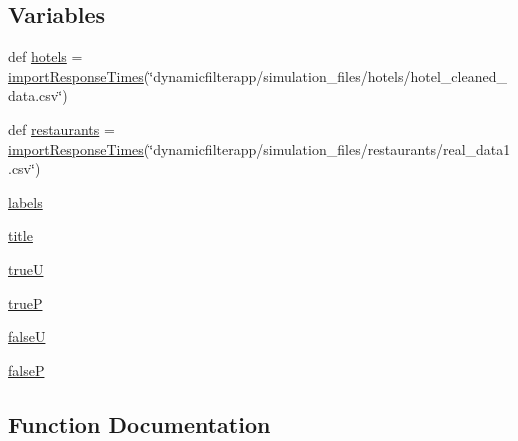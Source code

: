 \subsection*{Variables}
\begin{DoxyCompactItemize}
\item 
def \hyperlink{namespacedynamicfilterapp_1_1simulation__files_1_1response_time_distribution_a5dc6ecb2720239630808a8ab06ab1840}{hotels} = \hyperlink{namespacedynamicfilterapp_1_1simulation__files_1_1response_time_distribution_ae93872086b32d303395dd0b753af1775}{import\+Response\+Times}(\char`\"{}dynamicfilterapp/simulation\+\_\+files/hotels/hotel\+\_\+cleaned\+\_\+data.\+csv\char`\"{})
\item 
def \hyperlink{namespacedynamicfilterapp_1_1simulation__files_1_1response_time_distribution_a6caf9f682a37695b1f6baf64018c2994}{restaurants} = \hyperlink{namespacedynamicfilterapp_1_1simulation__files_1_1response_time_distribution_ae93872086b32d303395dd0b753af1775}{import\+Response\+Times}(\char`\"{}dynamicfilterapp/simulation\+\_\+files/restaurants/real\+\_\+data1.\+csv\char`\"{})
\item 
\hyperlink{namespacedynamicfilterapp_1_1simulation__files_1_1response_time_distribution_abc325fc13d4194905c1786e24ee447f0}{labels}
\item 
\hyperlink{namespacedynamicfilterapp_1_1simulation__files_1_1response_time_distribution_a051e403214cb6872ad3fe4e50302a6ee}{title}
\item 
\hyperlink{namespacedynamicfilterapp_1_1simulation__files_1_1response_time_distribution_afe318a0d18adb188fae94936f9b1d853}{trueU}
\item 
\hyperlink{namespacedynamicfilterapp_1_1simulation__files_1_1response_time_distribution_ae1891527aefb6a817d15668b0b1c0d6c}{trueP}
\item 
\hyperlink{namespacedynamicfilterapp_1_1simulation__files_1_1response_time_distribution_a0ab373b74e15cafdfd1ad2c58549a7c1}{falseU}
\item 
\hyperlink{namespacedynamicfilterapp_1_1simulation__files_1_1response_time_distribution_aa7f017430863ea8855038593e0853b30}{falseP}
\end{DoxyCompactItemize}


\subsection{Function Documentation}
\mbox{\label{namespacedynamicfilterapp_1_1simulation__files_1_1response_time_distribution_ae93872086b32d303395dd0b753af1775}} 
